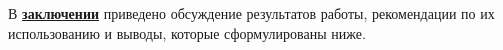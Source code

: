 



В \underline{\textbf{заключении}} приведено обсуждение результатов работы, рекомендации по их использованию и выводы, которые сформулированы ниже.




